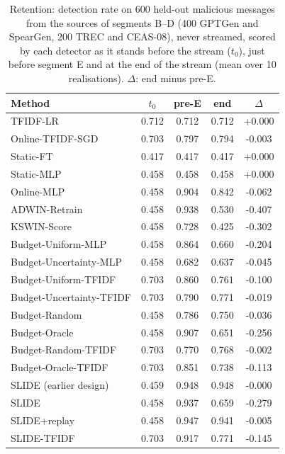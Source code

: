\begin{table}[t]
\centering
\caption{Retention: detection rate on 600 held-out malicious messages from the sources of segments B--D (400 GPTGen and SpearGen, 200 TREC and CEAS-08), never streamed, scored by each detector as it stands before the stream ($t_0$), just before segment E and at the end of the stream (mean over 10 realisations). $\Delta$: end minus pre-E.}
\label{tab:rev-retention}
\scriptsize
\setlength{\tabcolsep}{3pt}
\begin{tabular}{@{}lcccc@{}}
\toprule
Method & $t_0$ & pre-E & end & $\Delta$ \\
\midrule
TFIDF-LR & 0.712 & 0.712 & 0.712 & +0.000 \\
Online-TFIDF-SGD & 0.703 & 0.797 & 0.794 & -0.003 \\
Static-FT & 0.417 & 0.417 & 0.417 & +0.000 \\
\midrule
Static-MLP & 0.458 & 0.458 & 0.458 & +0.000 \\
Online-MLP & 0.458 & 0.904 & 0.842 & -0.062 \\
ADWIN-Retrain & 0.458 & 0.938 & 0.530 & -0.407 \\
KSWIN-Score & 0.458 & 0.728 & 0.425 & -0.302 \\
Budget-Uniform-MLP & 0.458 & 0.864 & 0.660 & -0.204 \\
\midrule
Budget-Uncertainty-MLP & 0.458 & 0.682 & 0.637 & -0.045 \\
Budget-Uniform-TFIDF & 0.703 & 0.860 & 0.761 & -0.100 \\
Budget-Uncertainty-TFIDF & 0.703 & 0.790 & 0.771 & -0.019 \\
Budget-Random & 0.458 & 0.786 & 0.750 & -0.036 \\
Budget-Oracle & 0.458 & 0.907 & 0.651 & -0.256 \\
Budget-Random-TFIDF & 0.703 & 0.770 & 0.768 & -0.002 \\
Budget-Oracle-TFIDF & 0.703 & 0.851 & 0.738 & -0.113 \\
\midrule
SLIDE (earlier design) & 0.459 & 0.948 & 0.948 & -0.000 \\
SLIDE & 0.458 & 0.937 & 0.659 & -0.279 \\
SLIDE+replay & 0.458 & 0.947 & 0.941 & -0.005 \\
SLIDE-TFIDF & 0.703 & 0.917 & 0.771 & -0.145 \\
\bottomrule
\end{tabular}
\end{table}
